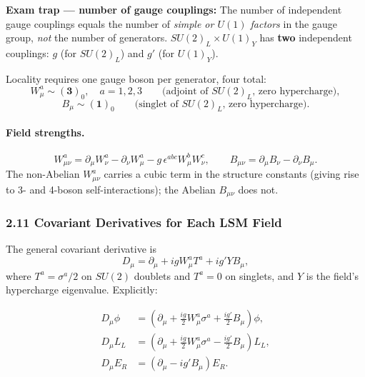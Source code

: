 \documentclass[12pt,a4paper]{article}
\newcommand{\nt}[1]{\begin{note}#1\end{note}}
\begin{document}
\nt{\textbf{Exam trap — number of gauge couplings:} The number of independent gauge couplings equals the number of \emph{simple or $U(1)$ factors} in the gauge group, \emph{not} the number of generators. $SU(2)_L \times U(1)_Y$ has \textbf{two} independent couplings: $g$ (for $SU(2)_L$) and $g'$ (for $U(1)_Y$).}

Locality requires one gauge boson per generator, four total:
\begin{equation}
  W^a_\mu \sim (\mathbf{3})_0 ,\quad a = 1,2,3
  \qquad\text{(adjoint of }SU(2)_L\text{, zero hypercharge)} ,
  \label{eq:sg:W_bosons}
\end{equation}
\begin{equation}
  B_\mu \sim (\mathbf{1})_0
  \qquad\text{(singlet of }SU(2)_L\text{, zero hypercharge)} .
  \label{eq:sg:B_boson}
\end{equation}

\paragraph{Field strengths.}
\begin{equation}
  \boxed{\;
  W^a_{\mu\nu} = \partial_\mu W^a_\nu - \partial_\nu W^a_\mu
               - g\,\epsilon^{abc}W^b_\mu W^c_\nu ,
  \qquad
  B_{\mu\nu} = \partial_\mu B_\nu - \partial_\nu B_\mu .
  \;}
  \label{eq:sg:field_strengths}
\end{equation}
The non-Abelian $W^a_{\mu\nu}$ carries a cubic term in the structure constants (giving rise to 3- and 4-boson self-interactions); the Abelian $B_{\mu\nu}$ does not.

\subsubsection*{2.11 \quad Covariant Derivatives for Each LSM Field}

The general covariant derivative is
\begin{equation}
  \boxed{\;
  D_\mu = \partial_\mu + igW^a_\mu T^a + ig'YB_\mu ,
  \;}
  \label{eq:sg:Dmu_general}
\end{equation}
where $T^a = \sigma^a/2$ on $SU(2)$ doublets and $T^a = 0$ on singlets, and $Y$ is the field's hypercharge eigenvalue. Explicitly:

\begin{align}
  D_\mu\phi &= \left(\partial_\mu + \frac{ig}{2}W^a_\mu\sigma^a + \frac{ig'}{2}B_\mu\right)\phi ,
  \label{eq:sg:Dphi}\\[4pt]
  D_\mu L_L &= \left(\partial_\mu + \frac{ig}{2}W^a_\mu\sigma^a - \frac{ig'}{2}B_\mu\right)L_L ,
  \label{eq:sg:DL}\\[4pt]
  D_\mu E_R &= \left(\partial_\mu - ig'B_\mu\right)E_R .
  \label{eq:sg:DE}
\end{align}
\end{document}
